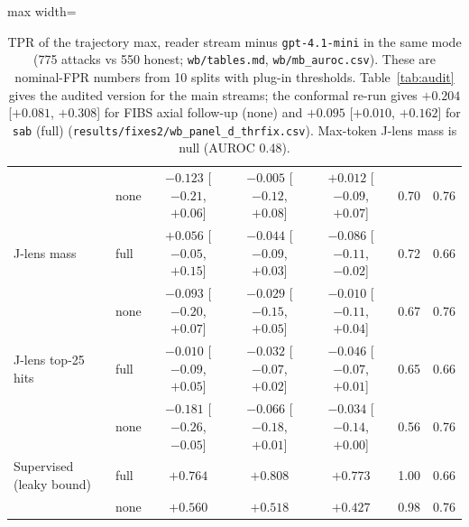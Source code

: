 \documentclass[11pt]{article}
\begin{document}
\begin{table}[!htbp]
\begin{adjustbox}{max width=\linewidth}
\begin{tabular}{@{}llccccc@{}}
 & none & $-0.123$ [$-0.21$, $+0.06$] & $-0.005$ [$-0.12$, $+0.08$] & $+0.012$ [$-0.09$, $+0.07$] & 0.70 & 0.76\\
J-lens mass & full & $+0.056$ [$-0.05$, $+0.15$] & $-0.044$ [$-0.09$, $+0.03$] & $-0.086$ [$-0.11$, $-0.02$] & 0.72 & 0.66\\
 & none & $-0.093$ [$-0.20$, $+0.07$] & $-0.029$ [$-0.15$, $+0.05$] & $-0.010$ [$-0.11$, $+0.04$] & 0.67 & 0.76\\
J-lens top-25 hits & full & $-0.010$ [$-0.09$, $+0.05$] & $-0.032$ [$-0.07$, $+0.02$] & $-0.046$ [$-0.07$, $+0.01$] & 0.65 & 0.66\\
 & none & $-0.181$ [$-0.26$, $-0.05$] & $-0.066$ [$-0.18$, $+0.01$] & $-0.034$ [$-0.14$, $+0.00$] & 0.56 & 0.76\\
Supervised (leaky bound) & full & $+0.764$ & $+0.808$ & $+0.773$ & 1.00 & 0.66\\
 & none & $+0.560$ & $+0.518$ & $+0.427$ & 0.98 & 0.76\\
\bottomrule
\end{tabular}\end{adjustbox}
\caption{TPR of the trajectory max, reader stream minus \texttt{gpt-4.1-mini} in the same mode (775 attacks vs 550 honest; \nolinkurl{wb/tables.md}, \nolinkurl{wb/mb_auroc.csv}). These are nominal-FPR numbers from 10 splits with plug-in thresholds. Table~\ref{tab:audit} gives the audited version for the main streams; the conformal re-run gives $+0.204$ [$+0.081$, $+0.308$] for FIBS axial follow-up (none) and $+0.095$ [$+0.010$, $+0.162$] for \texttt{sab} (full) (\nolinkurl{results/fixes2/wb_panel_d_thrfix.csv}). Max-token J-lens mass is null (AUROC 0.48).}\label{tab:mb}
\end{table}
\end{document}
